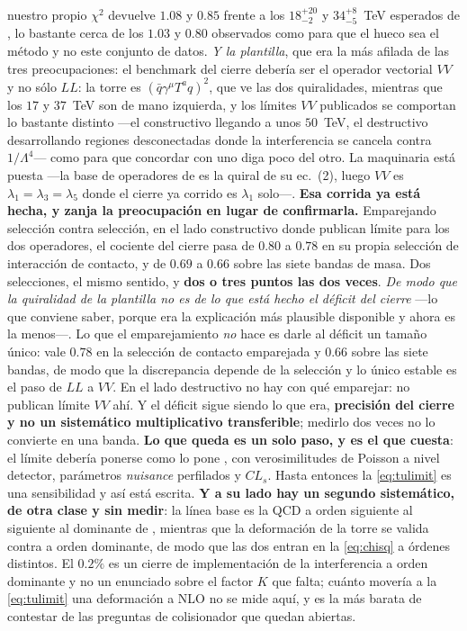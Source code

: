 \documentclass[11pt,a4paper]{article}
\begin{document}
\begin{itemize}
nuestro propio $\chi^2$ devuelve $1.08$ y $0.85$ frente a los $18^{+20}_{-2}$ y
$34^{+8}_{-5}$~TeV esperados de \cite{CMSangular}, lo bastante cerca de los $1.03$ y $0.80$
observados como para que el hueco sea el método y no este conjunto de datos. \emph{Y la
plantilla}, que era la más afilada de las tres preocupaciones: el
benchmark del cierre debería ser el operador vectorial $VV$ y no sólo $LL$: la torre es
$(\bar q\gamma^\mu T^aq)^2$, que ve las dos quiralidades, mientras que los $17$ y $37$~TeV son
de mano izquierda, y los límites $VV$ publicados se comportan lo bastante distinto ---el
constructivo llegando a unos $50$~TeV, el destructivo desarrollando regiones desconectadas donde
la interferencia se cancela contra $1/\Lambda^4$--- como para que concordar con uno diga poco
del otro. La maquinaria está puesta ---la base de operadores de \cite{CIJET} es la quiral de su
ec.~(2), luego $VV$ es $\lambda_1=\lambda_3=\lambda_5$ donde el cierre ya corrido es $\lambda_1$
solo---. \textbf{Esa corrida ya está hecha, y zanja la preocupación en lugar de confirmarla.}
Emparejando selección contra selección, en el lado constructivo donde \cite{CMSangular} publican
límite para los dos operadores, el cociente del cierre pasa de $0.80$ a $0.78$ en su propia
selección de interacción de contacto, y de $0.69$ a $0.66$ sobre las siete bandas de masa. Dos
selecciones, el mismo sentido, y \textbf{dos o tres puntos las dos veces}. \emph{De modo que la
quiralidad de la plantilla no es de lo que está hecho el déficit del cierre} ---lo que conviene
saber, porque era la explicación más plausible disponible y ahora es la menos---. Lo que el
emparejamiento \emph{no} hace es darle al déficit un tamaño único: vale $0.78$ en la selección de
contacto emparejada y $0.66$ sobre las siete bandas, de modo que la discrepancia depende de la
selección y lo único estable es el paso de $LL$ a $VV$. En el lado
destructivo no hay con qué emparejar: \cite{CMSangular} no publican límite $VV$ ahí. Y el déficit
sigue siendo lo que era, \textbf{precisión del cierre y no un sistemático multiplicativo
transferible}; medirlo dos veces no lo convierte en una banda. \textbf{Lo que queda es un solo
paso, y es el que cuesta}:
el límite
debería ponerse como lo pone \cite{CMSangular}, con verosimilitudes de Poisson a nivel detector,
parámetros \emph{nuisance} perfilados y $CL_s$.
Hasta entonces la \eqref{eq:tulimit} es una sensibilidad y así está escrita. \textbf{Y a su lado
hay un segundo sistemático, de otra clase y sin medir}: la línea base es la QCD a orden
siguiente al siguiente al dominante de \cite{CMSangular}, mientras que la deformación de la
torre se valida contra \cite{CIJET} a orden dominante, de modo que las dos entran en la
\eqref{eq:chisq} a órdenes distintos. El $0.2\%$ es un cierre de implementación de la
interferencia a orden dominante y no un enunciado sobre el factor $K$ que falta; cuánto movería
a la \eqref{eq:tulimit} una deformación a NLO no se mide aquí, y es la más barata de contestar
de las preguntas de colisionador que quedan abiertas.


\end{itemize}
\end{document}
